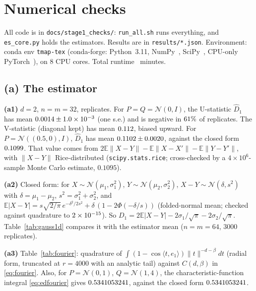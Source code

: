 \documentclass[11pt]{article}
\theoremstyle{definition}
\theoremstyle{remark}
\newcommand{\E}{\mathbb{E}}
\newcommand{\N}{\mathcal{N}}
\newcommand{\norm}[1]{\lVert #1\rVert}
\newcommand{\ip}[2]{\langle #1, #2\rangle}
\begin{document}
\section{Numerical checks}\label{sec:numerics}
All code is in \texttt{docs/stage1\_checks/}: \texttt{run\_all.sh} runs everything, and \texttt{es\_core.py}
holds the estimators. Results are in \texttt{results/*.json}. Environment: conda env \texttt{tmap-tex}
(conda-forge: Python~3.11, NumPy~\resNumpyVersion, SciPy~\resScipyVersion, CPU-only
PyTorch~\resTorchVersion), on 8 CPU cores. Total runtime \resTotalRuntime\ minutes.

\subsection*{(a) The estimator}
\textbf{(a1)} $d=2$, $n=m=32$, \resAoneReps{} replicates. For $P=Q=\N(0,I)$, the U-statistic $\widehat D_1$ has
mean $0.0014\pm1.0\times10^{-3}$ (one s.e.) and is negative in $61\%$ of
replicates. The V-statistic (diagonal kept) has mean $0.112$, biased upward. For
$P=\N((0.5,0),I)$, $\widehat D_1$ has mean $0.1102\pm0.0020$, against the closed form
$0.1099$. That value comes from $2\E\norm{X-Y}-\E\norm{X-X'}-\E\norm{Y-Y'}$, with $\norm{X-Y}$ Rice-distributed
(\texttt{scipy.stats.rice}; cross-checked by a $4\times10^6$-sample Monte Carlo estimate, $0.1095$).

\textbf{(a2)} Closed form: for $X\sim\N(\mu_1,\sigma_1^2)$, $Y\sim\N(\mu_2,\sigma_2^2)$, $X-Y\sim\N(\delta,s^2)$
with $\delta=\mu_1-\mu_2$, $s^2=\sigma_1^2+\sigma_2^2$, and
$\E|X-Y|=s\sqrt{2/\pi}\,e^{-\delta^2/2s^2}+\delta\,(1-2\Phi(-\delta/s))$ (folded-normal mean; checked
against quadrature to $2\times10^{-15}$). So $D_1=2\E|X-Y|-2\sigma_1/\sqrt\pi-2\sigma_2/\sqrt\pi$.
Table~\ref{tab:gauss1d} compares it with the estimator mean ($n=m=64$, $3000$ replicates).

\begin{table}[htbp]\centering\small
\caption{Check (a2): estimator mean vs closed-form $D_1$ for 1-D Gaussians.}\label{tab:gauss1d}

\end{table}

\textbf{(a3)} Table~\ref{tab:fourier}: quadrature of $\int(1-\cos\ip{t}{e_1})\norm t^{-d-\beta}dt$ (radial form,
truncated at $r=4000$ with an analytic tail) against $C(d,\beta)$ in \eqref{eq:fourier}. Also, for
$P=\N(0,1)$, $Q=\N(1,4)$, the characteristic-function integral \eqref{eq:edfourier} gives
$0.5341053241$, against the closed form $0.5341053241$.
\begin{table}[htbp]\centering\small
\caption{Check (a3): the constant $C(d,\beta)$ of Lemma~\ref{lem:fourier}.}\label{tab:fourier}

\end{table}
\end{document}
